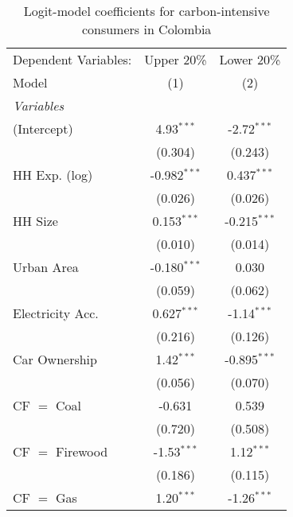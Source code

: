 
\begin{table}[htbp!]
   \centering
   \small
   \begin{adjustbox}{width = 1\textwidth, max height = 0.95\textheight, center}
      \begin{threeparttable}[b]
         \caption{\label{tab:Logit_1_COL} Logit-model coefficients for carbon-intensive consumers in Colombia}
         \begin{tabular}{lcc}
            \tabularnewline \midrule \midrule
            Dependent Variables: & Upper 20\%     & Lower 20\%\\   
            Model                & (1)            & (2)\\  
            \midrule
            \emph{Variables}\\
            (Intercept)          & 4.93$^{***}$   & -2.72$^{***}$\\   
                                 & (0.304)        & (0.243)\\   
            HH Exp. (log)        & -0.982$^{***}$ & 0.437$^{***}$\\   
                                 & (0.026)        & (0.026)\\   
            HH Size              & 0.153$^{***}$  & -0.215$^{***}$\\   
                                 & (0.010)        & (0.014)\\   
            Urban Area           & -0.180$^{***}$ & 0.030\\   
                                 & (0.059)        & (0.062)\\   
            Electricity Acc.     & 0.627$^{***}$  & -1.14$^{***}$\\   
                                 & (0.216)        & (0.126)\\   
            Car Ownership        & 1.42$^{***}$   & -0.895$^{***}$\\   
                                 & (0.056)        & (0.070)\\   
            CF $=$ Coal          & -0.631         & 0.539\\   
                                 & (0.720)        & (0.508)\\   
            CF $=$ Firewood      & -1.53$^{***}$  & 1.12$^{***}$\\   
                                 & (0.186)        & (0.115)\\   
            CF $=$ Gas           & 1.20$^{***}$   & -1.26$^{***}$\\   

\end{tabular}
\end{threeparttable}
\end{adjustbox}
\end{table}
